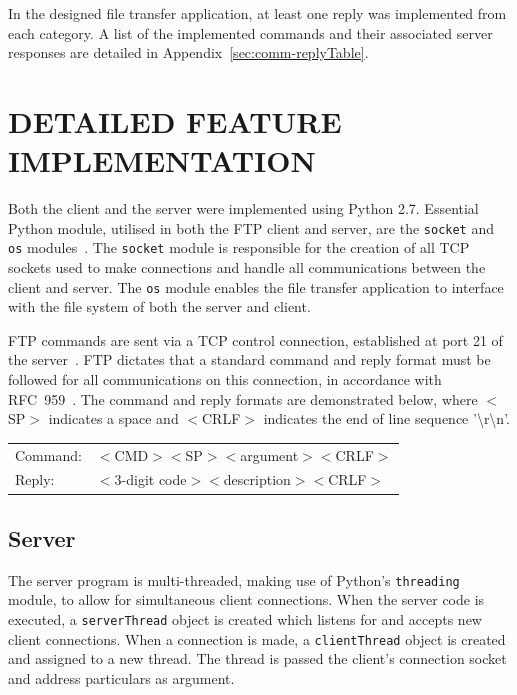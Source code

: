 \documentclass[10pt,twocolumn]{witseiepaper}
\begin{document}
In the designed file transfer application, at least one reply was implemented from each category. A list of the implemented commands and their associated server responses are detailed in Appendix~\ref{sec:comm-replyTable}.

\section{DETAILED FEATURE IMPLEMENTATION} %

Both the client and the server were implemented using Python 2.7. Essential Python module, utilised in both the FTP client and server, are the \texttt{socket} and \texttt{os} modules~\cite{osModule,socketModule}. The \texttt{socket} module is responsible for the creation of all TCP sockets used to make connections and handle all communications between the client and server. The \texttt{os} module enables the file transfer application to interface with the file system of both the server and client.

FTP commands are sent via a TCP control connection, established at port 21 of the server~\cite{topDownApproach6th}. FTP dictates that a standard command and reply format must be followed for all communications on this connection, in accordance with RFC~959~\cite{rfc959}. The command and reply formats are demonstrated below, where $<$SP$>$ indicates a space and $<$CRLF$>$ indicates the end of line sequence '\textbackslash r\textbackslash n'.

\begin{tabular}{ll}
Command:& $<$CMD$>$$<$SP$>$$<$argument$>$$<$CRLF$>$ \\[5pt]
Reply:& $<$3-digit code$>$$<$description$>$$<$CRLF$>$ \\[5pt]
\end{tabular} 

\vspace*{-2mm}
\subsection{Server}

 The server program is multi-threaded, making use of Python's \texttt{threading} module, to allow for simultaneous client connections. When the server code is executed, a \texttt{serverThread} object is created which listens for and accepts new client connections. When a connection is made, a \texttt{clientThread} object is created and assigned to a new thread. The thread is passed the client's connection socket and address particulars as argument.
 
\end{document}
